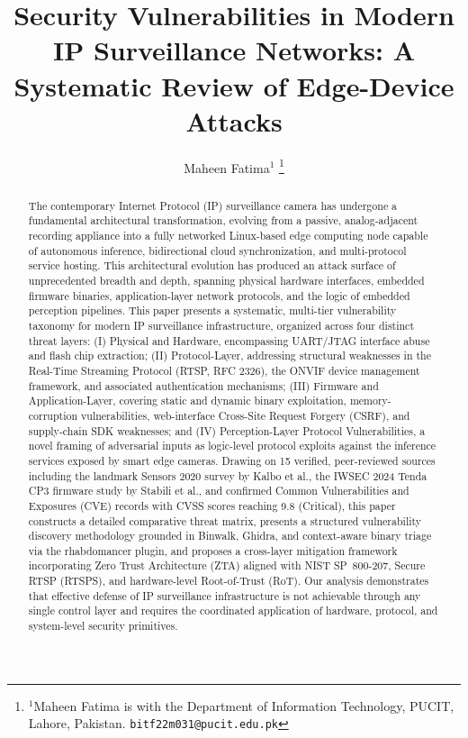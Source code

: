 \documentclass[letterpaper, 10pt, conference]{ieeeconf}
\title{\LARGE \bf
Security Vulnerabilities in Modern IP Surveillance Networks:
A Systematic Review of Edge-Device Attacks
}
\author{Maheen Fatima$^{1}$%
\thanks{$^{1}$Maheen Fatima is with the Department of Information
Technology, PUCIT, Lahore, Pakistan.
{\tt\small bitf22m031@pucit.edu.pk}}%
}
\begin{document}
\maketitle
\thispagestyle{empty}
\pagestyle{empty}

\begin{abstract}

The contemporary Internet Protocol (IP) surveillance camera has undergone
a fundamental architectural transformation, evolving from a passive,
analog-adjacent recording appliance into a fully networked Linux-based
edge computing node capable of autonomous inference, bidirectional cloud
synchronization, and multi-protocol service hosting. This architectural
evolution has produced an attack surface of unprecedented breadth and
depth, spanning physical hardware interfaces, embedded firmware
binaries, application-layer network protocols, and the logic of embedded
perception pipelines. This paper presents a systematic, multi-tier
vulnerability taxonomy for modern IP surveillance infrastructure, organized
across four distinct threat layers: (I) Physical and Hardware, encompassing
UART/JTAG interface abuse and flash chip extraction; (II) Protocol-Layer,
addressing structural weaknesses in the Real-Time Streaming Protocol (RTSP,
RFC 2326), the ONVIF device management framework, and associated
authentication mechanisms; (III) Firmware and Application-Layer, covering
static and dynamic binary exploitation, memory-corruption vulnerabilities,
web-interface Cross-Site Request Forgery (CSRF), and supply-chain SDK
weaknesses; and (IV) Perception-Layer Protocol Vulnerabilities, a novel
framing of adversarial inputs as logic-level protocol exploits against the
inference services exposed by smart edge cameras. Drawing on 15 verified,
peer-reviewed sources including the landmark Sensors 2020 survey by Kalbo
et al., the IWSEC 2024 Tenda CP3 firmware study by Stabili et al., and
confirmed Common Vulnerabilities and Exposures (CVE) records with CVSS
scores reaching 9.8 (Critical), this paper constructs a detailed
comparative threat matrix, presents a structured vulnerability discovery
methodology grounded in Binwalk, Ghidra, and context-aware binary triage
via the rhabdomancer plugin, and proposes a cross-layer mitigation
framework incorporating Zero Trust Architecture (ZTA) aligned with NIST
SP~800-207, Secure RTSP (RTSPS), and hardware-level Root-of-Trust (RoT).
Our analysis demonstrates that effective defense of IP surveillance
infrastructure is not achievable through any single control layer and
requires the coordinated application of hardware, protocol, and
system-level security primitives.

\end{abstract}
\end{document}
